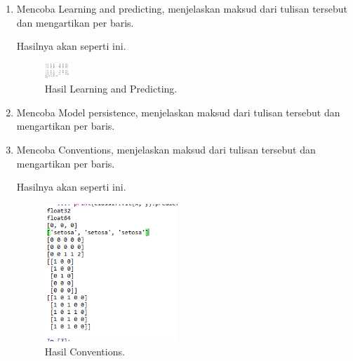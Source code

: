 \begin{enumerate}
	\item Mencoba  Learning  and  predicting,  menjelaskan  maksud  dari  tulisan  tersebut dan mengartikan per baris.
	
	
	Hasilnya akan seperti ini.
	\begin{figure}[H]
		\includegraphics[width=1cm]{figures/1174002/chapter1/praktek/2.png}
		\centering
		\caption{Hasil Learning and Predicting.}
	\end{figure}

	\item Mencoba Model persistence, menjelaskan maksud dari tulisan tersebut dan mengartikan per baris.
	


	\item Mencoba Conventions, menjelaskan maksud dari tulisan tersebut dan mengartikan per baris.
	
	
	Hasilnya akan seperti ini.
	\begin{figure}[H]
		\includegraphics[width=5cm]{figures/1174002/chapter1/praktek/4.png}
		\centering
		\caption{Hasil Conventions.}
	\end{figure}

\end{enumerate}
